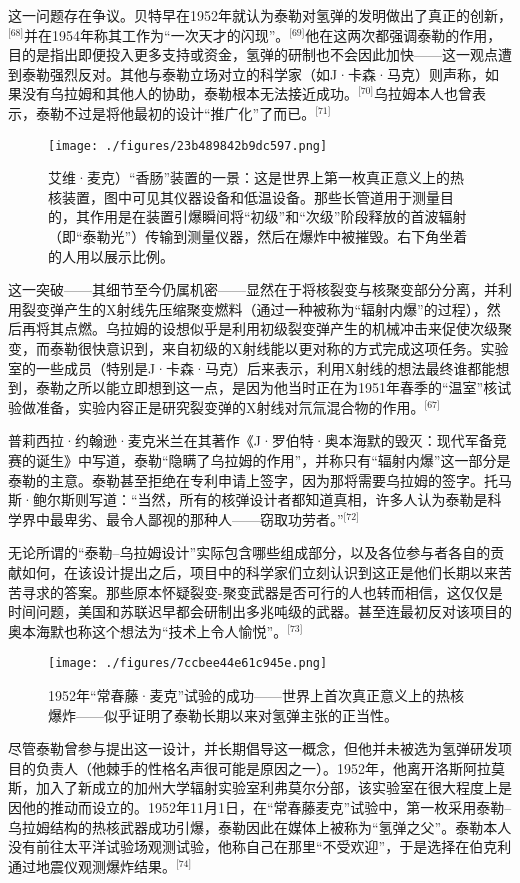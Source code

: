 这一问题存在争议。贝特早在1952年就认为泰勒对氢弹的发明做出了真正的创新，\(^\text{[68]}\)并在1954年称其工作为“一次天才的闪现”。\(^\text{[69]}\)他在这两次都强调泰勒的作用，目的是指出即便投入更多支持或资金，氢弹的研制也不会因此加快——这一观点遭到泰勒强烈反对。其他与泰勒立场对立的科学家（如J·卡森·马克）则声称，如果没有乌拉姆和其他人的协助，泰勒根本无法接近成功。\(^\text{[70]}\)乌拉姆本人也曾表示，泰勒不过是将他最初的设计“推广化”了而已。\(^\text{[71]}\)
\begin{figure}[ht]
\centering
\texttt{[image: ./figures/23b489842b9dc597.png]}
\caption{艾维·麦克）“香肠”装置的一景：这是世界上第一枚真正意义上的热核装置，图中可见其仪器设备和低温设备。那些长管道用于测量目的，其作用是在装置引爆瞬间将“初级”和“次级”阶段释放的首波辐射（即“泰勒光”）传输到测量仪器，然后在爆炸中被摧毁。右下角坐着的人用以展示比例。} \label{fig_ADHTL_8}
\end{figure}
这一突破——其细节至今仍属机密——显然在于将核裂变与核聚变部分分离，并利用裂变弹产生的X射线先压缩聚变燃料（通过一种被称为“辐射内爆”的过程），然后再将其点燃。乌拉姆的设想似乎是利用初级裂变弹产生的机械冲击来促使次级聚变，而泰勒很快意识到，来自初级的X射线能以更对称的方式完成这项任务。实验室的一些成员（特别是J·卡森·马克）后来表示，利用X射线的想法最终谁都能想到，泰勒之所以能立即想到这一点，是因为他当时正在为1951年春季的“温室”核试验做准备，实验内容正是研究裂变弹的X射线对氘氚混合物的作用。\(^\text{[67]}\)

普莉西拉·约翰逊·麦克米兰在其著作《J·罗伯特·奥本海默的毁灭：现代军备竞赛的诞生》中写道，泰勒“隐瞒了乌拉姆的作用”，并称只有“辐射内爆”这一部分是泰勒的主意。泰勒甚至拒绝在专利申请上签字，因为那将需要乌拉姆的签字。托马斯·鲍尔斯则写道：“当然，所有的核弹设计者都知道真相，许多人认为泰勒是科学界中最卑劣、最令人鄙视的那种人——窃取功劳者。”\(^\text{[72]}\)

无论所谓的“泰勒–乌拉姆设计”实际包含哪些组成部分，以及各位参与者各自的贡献如何，在该设计提出之后，项目中的科学家们立刻认识到这正是他们长期以来苦苦寻求的答案。那些原本怀疑裂变-聚变武器是否可行的人也转而相信，这仅仅是时间问题，美国和苏联迟早都会研制出多兆吨级的武器。甚至连最初反对该项目的奥本海默也称这个想法为“技术上令人愉悦”。\(^\text{[73]}\)
\begin{figure}[ht]
\centering
\texttt{[image: ./figures/7ccbee44e61c945e.png]}
\caption{1952年“常春藤·麦克”试验的成功——世界上首次真正意义上的热核爆炸——似乎证明了泰勒长期以来对氢弹主张的正当性。} \label{fig_ADHTL_9}
\end{figure}
尽管泰勒曾参与提出这一设计，并长期倡导这一概念，但他并未被选为氢弹研发项目的负责人（他棘手的性格名声很可能是原因之一）。1952年，他离开洛斯阿拉莫斯，加入了新成立的加州大学辐射实验室利弗莫尔分部，该实验室在很大程度上是因他的推动而设立的。1952年11月1日，在“常春藤麦克”试验中，第一枚采用泰勒–乌拉姆结构的热核武器成功引爆，泰勒因此在媒体上被称为“氢弹之父”。泰勒本人没有前往太平洋试验场观测试验，他称自己在那里“不受欢迎”，于是选择在伯克利通过地震仪观测爆炸结果。\(^\text{[74]}\)

